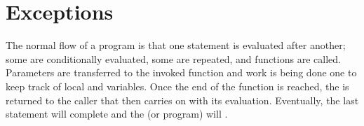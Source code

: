 \chapter{Exceptions}
\label{sec:exceptions}

The normal flow of a program is that one statement is evaluated after another; some are conditionally evaluated, some are repeated, and functions are called. Parameters are transferred to the invoked function and work is being done one  to keep track of local  and  variables. Once the end of the function is reached, the  is returned to the caller that then carries on with its evaluation. Eventually, the last statement will complete and the  (or program) will .

